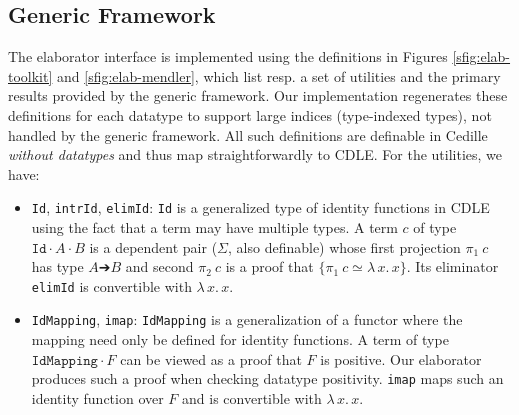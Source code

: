 \documentclass{article}
\newcommand{\abs}[4]{{#1}\, #2\! : \! #3.\, #4}
\newcommand{\absu}[3]{{#1}\, #2.\, #3}
\newcommand{\splab}[1]{\ensuremath{^{\text{#1}}}}
\begin{document}

\subsection{Generic Framework}
The elaborator interface is implemented using the definitions in Figures
\ref{sfig:elab-toolkit} and \ref{sfig:elab-mendler}, which list resp. a set of
utilities and the primary results provided by the generic framework. Our
implementation regenerates these definitions for each datatype to support large
indices (type-indexed types), not handled by the generic framework. All such definitions
are definable in Cedille \textit{without datatypes} and thus map straightforwardly
to CDLE. For the utilities, we have:
\begin{itemize}
\item \texttt{Id}, \texttt{intrId}, \texttt{elimId}: \texttt{Id} is a generalized type of identity functions in CDLE using the
  fact that a term may have multiple types. A term $c$ of type
  $\texttt{Id} ·A ·B$ is a dependent pair ($\Sigma$, also definable) whose first projection
  $\pi_1\ c$ has type \(A ➔ B\) and second $\pi_2\ c$ is a
  proof that \(\{\pi_1\ c ≃ \absu{λ}{x}{x}\}\). Its eliminator \texttt{elimId}
  is convertible with $\absu{λ}{x}{x}$.
\item \texttt{IdMapping}, \texttt{imap}: \texttt{IdMapping} is a generalization of a functor where the mapping
  need only be defined for identity functions. A term of type $\texttt{IdMapping}
  · F$ can be viewed as a proof that $F$ is positive. Our elaborator
  produces such a proof when checking datatype positivity. \texttt{imap} maps such
  an identity function over $F$ and is convertible with $\absu{λ}{x}{x}$.
\end{itemize}
\end{document}
